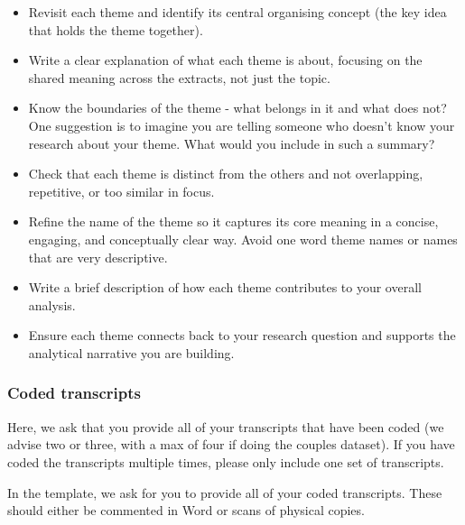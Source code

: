 \documentclass[
  english,
  letterpaper,
  DIV=11,
  numbers=noendperiod]{scrreprt}
\providecommand{\tightlist}{%
  \setlength{\itemsep}{0pt}\setlength{\parskip}{0pt}}
\begin{document}
\begin{itemize}
\tightlist
\item
  Revisit each theme and identify its central organising concept (the
  key idea that holds the theme together).
\item
  Write a clear explanation of what each theme is about, focusing on the
  shared meaning across the extracts, not just the topic.
\item
  Know the boundaries of the theme - what belongs in it and what does
  not? One suggestion is to imagine you are telling someone who doesn't
  know your research about your theme. What would you include in such a
  summary?
\item
  Check that each theme is distinct from the others and not overlapping,
  repetitive, or too similar in focus.
\item
  Refine the name of the theme so it captures its core meaning in a
  concise, engaging, and conceptually clear way. Avoid one word theme
  names or names that are very descriptive.
\item
  Write a brief description of how each theme contributes to your
  overall analysis.
\item
  Ensure each theme connects back to your research question and supports
  the analytical narrative you are building.
\end{itemize}

\subsubsection{Coded transcripts}\label{coded-transcripts}

Here, we ask that you provide all of your transcripts that have been
coded (we advise two or three, with a max of four if doing the couples
dataset). If you have coded the transcripts multiple times, please only
include one set of transcripts.

\begin{tcolorbox}[enhanced jigsaw, breakable, bottomtitle=1mm, leftrule=.75mm, opacityback=0, colbacktitle=quarto-callout-important-color!10!white, opacitybacktitle=0.6, toprule=.15mm, colback=white, left=2mm, coltitle=black, bottomrule=.15mm, titlerule=0mm, title=\textcolor{quarto-callout-important-color}{\faExclamation}\hspace{0.5em}{Coded transcripts: What is asked for?}, toptitle=1mm, colframe=quarto-callout-important-color-frame, arc=.35mm, rightrule=.15mm]

In the template, we ask for you to provide all of your coded
transcripts. These should either be commented in Word or scans of
physical copies.

\end{tcolorbox}
\end{document}
